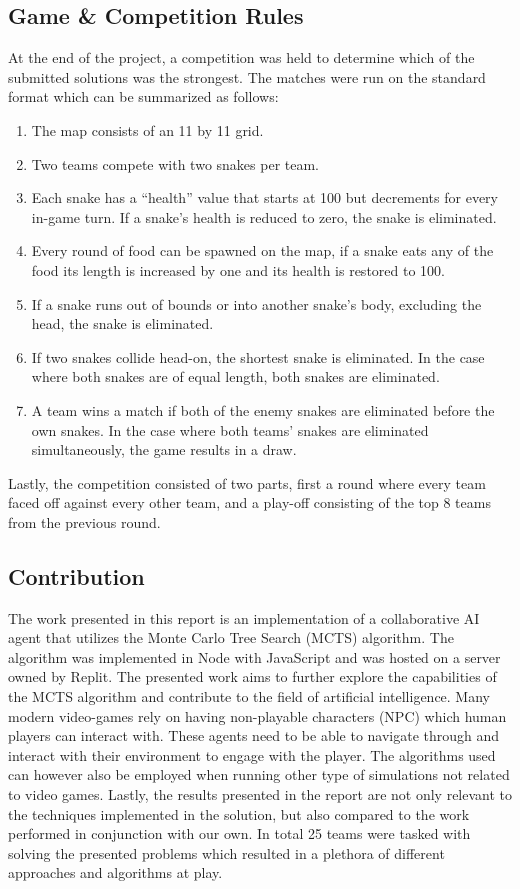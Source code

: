 \documentclass[a4paper,12pt]{article}
\begin{document}
\subsection{Game \& Competition Rules}
At the end of the project, a competition was held to determine which of the submitted solutions was the strongest. The matches were run on the standard format which can be summarized as follows:

\begin{enumerate}
    \item The map consists of an 11 by 11 grid.
    \item Two teams compete with two snakes per team.
    \item Each snake has a “health” value that starts at 100 but decrements for every in-game turn. If a snake’s health is reduced to zero, the snake is eliminated.
    \item Every round of food can be spawned on the map, if a snake eats any of the food its length is increased by one and its health is restored to 100.
    \item If a snake runs out of bounds or into another snake's body, excluding the head, the snake is eliminated.
    \item If two snakes collide head-on, the shortest snake is eliminated. In the case where both snakes are of equal length, both snakes are eliminated.
    \item A team wins a match if both of the enemy snakes are eliminated before the own snakes. In the case where both teams’ snakes are eliminated simultaneously, the game results in a draw.
\end{enumerate}
Lastly, the competition consisted of two parts, first a round where every team faced off against every other team, and a play-off consisting of the top 8 teams from the previous round.


\subsection{Contribution}
The work presented in this report is an implementation of a collaborative AI agent that utilizes the Monte Carlo Tree Search (MCTS) algorithm. The algorithm was implemented in Node with JavaScript and was hosted on a server owned by Replit. The presented work aims to further explore the capabilities of the MCTS algorithm and contribute to the field of artificial intelligence. Many modern video-games rely on having non-playable characters (NPC) which human players can interact with. These agents need to be able to navigate through and interact with their environment to engage with the player. The algorithms used can however also be employed when running other type of simulations not related to video games. Lastly, the results presented in the report are not only relevant to the techniques implemented in the solution, but also compared to the work performed in conjunction with our own. In total 25 teams were tasked with solving the presented problems which resulted in a plethora of different approaches and algorithms at play. 
\end{document}
